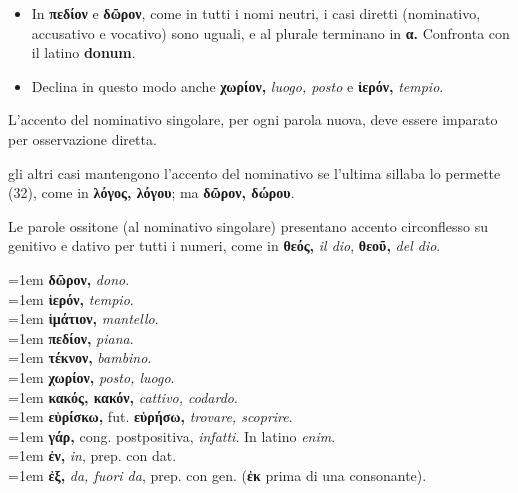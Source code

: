 \documentclass[nols]{tufte-handout}
\newcommand{\textls}[2][5]{%
    \begingroup\addfontfeatures{LetterSpace=#1}#2\endgroup
  }
\renewcommand{\smallcapsspacing}[1]{\textls[10]{#1}}
\renewcommand{\textsc}[1]{\smallcapsspacing{\textsmallcaps{#1}}}
\begin{document}
\begin{itemize}
\item[\textsc{1.}] In \textbf{πεδίον} e \textbf{δῶρον}, come in tutti i nomi neutri, i casi diretti (nominativo, accusativo e vocativo) sono uguali, e al plurale terminano in \textbf{α.} Confronta con il latino \textbf{donum}.  
\item[\textsc{2. Esercizio}] Declina in questo modo anche \textbf{χωρίον,} \textit{luogo, posto} e \textbf{ἱερόν,} \textit{tempio}.
\end{itemize}

 L'accento del nominativo singolare, per ogni parola nuova, deve essere imparato per osservazione diretta.

 gli altri casi mantengono l'accento del nominativo se l'ultima sillaba lo permette (32), come in \textbf{λόγος, λόγου}; ma \textbf{δῶρον, δώρου}.

 Le parole ossitone (al nominativo singolare) presentano accento circonflesso 
su genitivo e dativo per tutti i numeri, come in \textbf{θεός,} \textit{il dio}, \textbf{θεοῦ,} \textit{del dio}.


\begin{multicols}{2}
    \noindent \hangindent=1em \textbf{δῶρον,} \textit{dono}.  \\
    \noindent \hangindent=1em \textbf{ἱερόν,} \textit{tempio}.  \\
    \noindent \hangindent=1em \textbf{ἱμάτιον,} \textit{mantello}.  \\
    \noindent \hangindent=1em \textbf{πεδίον,} \textit{piana}.  \\
    \noindent \hangindent=1em \textbf{τέκνον,} \textit{bambino}.  \\
    \noindent \hangindent=1em \textbf{χωρίον,} \textit{posto, luogo}.  \\
    \noindent \hangindent=1em \textbf{κακός, κακόν,} \textit{cattivo, codardo}.  \\
    \noindent \hangindent=1em \textbf{εὑρίσκω,} fut. \textbf{εὑρήσω,} \textit{trovare, scoprire}.  \\
    \noindent \hangindent=1em \textbf{γάρ,} cong. postpositiva, \textit{infatti}. In latino \textit{enim}.   \\
    \noindent \hangindent=1em \textbf{ἐν,} \textit{in}, prep. con dat.  \\
    \noindent \hangindent=1em \textbf{ἐξ,} \textit{da, fuori da}, prep. con gen. (\textbf{ἐκ} prima di una consonante). \\ 
\end{multicols}
\end{document}
